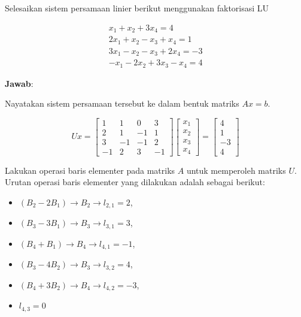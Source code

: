 \documentclass[]{book}
\providecommand{\tightlist}{%
  \setlength{\itemsep}{0pt}\setlength{\parskip}{0pt}}
\theoremstyle{definition}
\theoremstyle{definition}
\theoremstyle{definition}
\theoremstyle{remark}
\let\BeginKnitrBlock\begin \let\EndKnitrBlock\end
\begin{document}
\BeginKnitrBlock{example}
\protect\hypertarget{exm:LUexmp}{}{\label{exm:LUexmp} }Selesaikan sistem persamaan linier berikut menggunakan faktorisasi LU
\EndKnitrBlock{example}

\[
\begin{matrix}
  x_1+x_2+3x_4=4 \\
  2x_1+x_2-x_3+x_4=1 \\
  3x_1-x_2-x_3+2x_4=-3 \\
  -x_1-2x_2+3x_3-x_4=4
\end{matrix}
\]

\textbf{Jawab}:

Nayatakan sistem persamaan tersebut ke dalam bentuk matriks \(Ax=b\).

\begin{equation*}
Ux=
\begin{bmatrix}
     1       & 1       & 0       & 3           \\[0.3em]
     2       & 1       & -1      & 1           \\[0.3em]
     3       & -1      & -1      & 2           \\[0.3em]
     -1      & 2       & 3       & -1           
     \end{bmatrix}
\begin{bmatrix}
     x_1                                          \\[0.3em]
     x_2                                          \\[0.3em]
     x_3                                          \\[0.3em]
     x_4                                       
     \end{bmatrix}
= \begin{bmatrix}
     4                                          \\[0.3em]
     1                                          \\[0.3em]
     -3                                          \\[0.3em]
     4                                       
     \end{bmatrix}
\end{equation*}

Lakukan operasi baris elementer pada matriks \(A\) untuk memperoleh matriks \(U\). Urutan operasi baris elementer yang dilakukan adalah sebagai berikut:

\begin{itemize}
\tightlist
\item
  \(\left(B_2-2B_1\right)\to B_2 \to l_{2,1}=2\),
\item
  \(\left(B_3-3B_1\right)\to B_3 \to l_{3,1}=3\),
\item
  \(\left(B_4+B_1\right)\to B_4 \to l_{4,1}=-1\),
\item
  \(\left(B_3-4B_2\right)\to B_3\to l_{3,2}=4\),
\item
  \(\left(B_4+3B_2\right)\to B_4 \to l_{4,2}=-3\),
\item
  \(l_{4,3}=0\)
\end{itemize}
\end{document}
